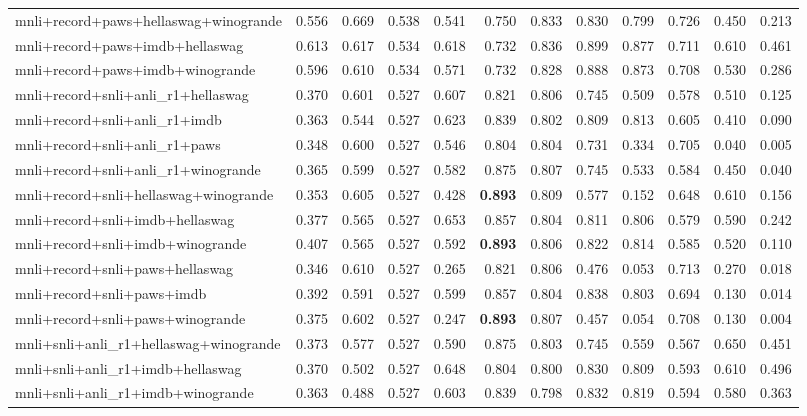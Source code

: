 \begin{table}[t]
\begin{tabular}{lrrrrrrrrrrr}
    mnli+record+paws+hellaswag+winogrande & 0.556 & 0.669 & 0.538 & 0.541 & 0.750 & 0.833 & 0.830 & 0.799 & 0.726 & 0.450 & 0.213 \\
    mnli+record+paws+imdb+hellaswag & 0.613 & 0.617 & 0.534 & 0.618 & 0.732 & 0.836 & 0.899 & 0.877 & 0.711 & 0.610 & 0.461 \\
    mnli+record+paws+imdb+winogrande & 0.596 & 0.610 & 0.534 & 0.571 & 0.732 & 0.828 & 0.888 & 0.873 & 0.708 & 0.530 & 0.286 \\
    mnli+record+snli+anli\_r1+hellaswag & 0.370 & 0.601 & 0.527 & 0.607 & 0.821 & 0.806 & 0.745 & 0.509 & 0.578 & 0.510 & 0.125 \\
    mnli+record+snli+anli\_r1+imdb & 0.363 & 0.544 & 0.527 & 0.623 & 0.839 & 0.802 & 0.809 & 0.813 & 0.605 & 0.410 & 0.090 \\
    mnli+record+snli+anli\_r1+paws & 0.348 & 0.600 & 0.527 & 0.546 & 0.804 & 0.804 & 0.731 & 0.334 & 0.705 & 0.040 & 0.005 \\
    mnli+record+snli+anli\_r1+winogrande & 0.365 & 0.599 & 0.527 & 0.582 & 0.875 & 0.807 & 0.745 & 0.533 & 0.584 & 0.450 & 0.040 \\
    mnli+record+snli+hellaswag+winogrande & 0.353 & 0.605 & 0.527 & 0.428 & \textbf{0.893} & 0.809 & 0.577 & 0.152 & 0.648 & 0.610 & 0.156 \\
    mnli+record+snli+imdb+hellaswag & 0.377 & 0.565 & 0.527 & 0.653 & 0.857 & 0.804 & 0.811 & 0.806 & 0.579 & 0.590 & 0.242 \\
    mnli+record+snli+imdb+winogrande & 0.407 & 0.565 & 0.527 & 0.592 & \textbf{0.893} & 0.806 & 0.822 & 0.814 & 0.585 & 0.520 & 0.110 \\
    mnli+record+snli+paws+hellaswag & 0.346 & 0.610 & 0.527 & 0.265 & 0.821 & 0.806 & 0.476 & 0.053 & 0.713 & 0.270 & 0.018 \\
    mnli+record+snli+paws+imdb & 0.392 & 0.591 & 0.527 & 0.599 & 0.857 & 0.804 & 0.838 & 0.803 & 0.694 & 0.130 & 0.014 \\
    mnli+record+snli+paws+winogrande & 0.375 & 0.602 & 0.527 & 0.247 & \textbf{0.893} & 0.807 & 0.457 & 0.054 & 0.708 & 0.130 & 0.004 \\
    mnli+snli+anli\_r1+hellaswag+winogrande & 0.373 & 0.577 & 0.527 & 0.590 & 0.875 & 0.803 & 0.745 & 0.559 & 0.567 & 0.650 & 0.451 \\
    mnli+snli+anli\_r1+imdb+hellaswag & 0.370 & 0.502 & 0.527 & 0.648 & 0.804 & 0.800 & 0.830 & 0.809 & 0.593 & 0.610 & 0.496 \\
    mnli+snli+anli\_r1+imdb+winogrande & 0.363 & 0.488 & 0.527 & 0.603 & 0.839 & 0.798 & 0.832 & 0.819 & 0.594 & 0.580 & 0.363 \\

\end{tabular}
\end{table}
